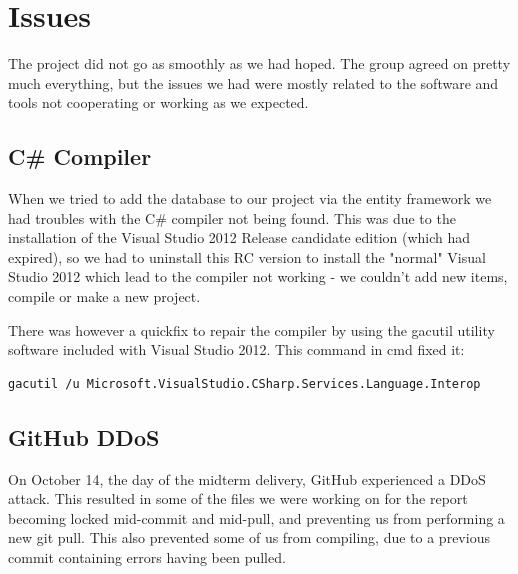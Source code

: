 \section{Issues}
The project did not go as smoothly as we had hoped. The group agreed on pretty much everything, but the issues we had were mostly related to the software and tools not cooperating or working as we expected.

\subsection{C\# Compiler}
When we tried to add the database to our project via the entity framework we had troubles with the C\# compiler not being found. This was due to the installation of the Visual Studio 2012 Release candidate edition (which had expired), so we had to uninstall this RC version to install the "normal" Visual Studio 2012 which lead to the compiler not working - we couldn't add new items, compile or make a new project.

There was however a quickfix to repair the compiler by using the gacutil utility software included with Visual Studio 2012.
This command in cmd fixed it:
\begin{verbatim}
gacutil /u Microsoft.VisualStudio.CSharp.Services.Language.Interop 
\end{verbatim}

\subsection{GitHub DDoS}
On October 14, the day of the midterm delivery, GitHub experienced a DDoS attack. This resulted in some of the files we were working on for the report becoming locked mid-commit and mid-pull, and preventing us from performing a new git pull. This also prevented some of us from compiling, due to a previous commit containing errors having been pulled.



